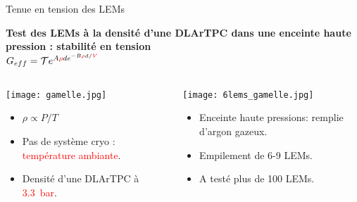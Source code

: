     \begin{frame}{Tenue en tension des LEMs}
    	\begin{scriptsize}
    		\begin{center}
    			\textbf{Test des LEMs à la densité d'une DLArTPC dans une enceinte haute pression : stabilité en tension}\\
    			$G _{eff}= \mathcal{T}e^{A\textcolor{red}{\rho} d e^{-B\textcolor{red}{\rho}d/\textcolor{red}{V}}}$
    		\end{center} 
    		\begin{columns}
		    	\begin{column}{0.5\textwidth}
		    		\texttt{[image: gamelle.jpg]}\\
		    		\begin{itemize}
		    			\item $\rho \propto P/T$
		    			\item Pas de système cryo : \textcolor{red}{température ambiante}.
		    			\item Densité d'une DLArTPC à \textcolor{red}{\SI{3.3}{\bar}}.
		    		\end{itemize}
		    	\end{column}\hfill
		    	\begin{column}{0.5\textwidth}
		    		\texttt{[image: 6lems\_gamelle.jpg]}\\
		    		\begin{itemize}
		    			\item Enceinte haute pressions: remplie d'argon gazeux.
		    			\item Empilement de 6-9 LEMs.
		    			\item A testé plus de 100 LEMs.
		    		\end{itemize}
		    	\end{column}
		    \end{columns}
	    \end{scriptsize} 
    \end{frame}

